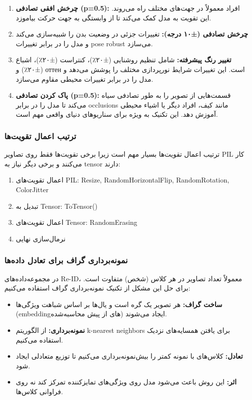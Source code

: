\documentclass[12pt,a4paper]{article}
\theoremstyle{definition}
\begin{document}
\begin{enumerate}
    \item \textbf{چرخش افقی تصادفی (p=0.5):} افراد معمولاً در جهت‌های مختلف راه می‌روند. این تقویت به مدل کمک می‌کند تا از وابستگی به جهت حرکت بیاموزد.

    \item \textbf{چرخش تصادفی (±۱۰ درجه):} تغییرات جزئی در وضعیت بدن را شبیه‌سازی می‌کند و مدل را در برابر تغییرات pose robust می‌سازد.

    \item \textbf{تغییر رنگ پیشرفته:} شامل تنظیم روشنایی (±۲۰٪)، کنتراست (±۲۰٪)، اشباع (±۲۰٪) و оттен است. این تغییرات شرایط نورپردازی مختلف را پوشش می‌دهد و مدل را در برابر تغییرات محیطی مقاوم می‌سازد.

    \item \textbf{پاک کردن تصادفی (p=0.5):} قسمت‌هایی از تصویر را به طور تصادفی سیاه می‌کند تا مدل را در برابر occlusions مانند کیف، افراد دیگر یا اشیاء محیطی آموزش دهد. این تکنیک به ویژه برای سناریوهای دنیای واقعی مهم است.
\end{enumerate}

\subsubsection*{ترتیب اعمال تقویت‌ها}
ترتیب اعمال تقویت‌ها بسیار مهم است زیرا برخی تقویت‌ها فقط روی تصاویر PIL کار می‌کنند و برخی دیگر نیاز به tensor دارند:

\begin{enumerate}
    \item اعمال تقویت‌های PIL: Resize, RandomHorizontalFlip, RandomRotation, ColorJitter
    \item تبدیل به Tensor: ToTensor()
    \item اعمال تقویت‌های Tensor: RandomErasing
    \item نرمال‌سازی نهایی
\end{enumerate}

\subsubsection*{نمونه‌برداری گراف برای تعادل داده‌ها}
در مجموعه‌داده‌های Re-ID، معمولاً تعداد تصاویر در هر کلاس (شخص) متفاوت است. برای حل این مشکل از تکنیک نمونه‌برداری گراف استفاده می‌کنیم:

\begin{itemize}
    \item \textbf{ساخت گراف:} هر تصویر یک گره است و یال‌ها بر اساس شباهت ویژگی‌ها (embeddingهای از پیش محاسبه‌شده) ایجاد می‌شوند.
    \item \textbf{نمونه‌برداری:} از الگوریتم k-nearest neighbors برای یافتن همسایه‌های نزدیک استفاده می‌کنیم.
    \item \textbf{تعادل:} کلاس‌های با نمونه کمتر را بیش‌نمونه‌برداری می‌کنیم تا توزیع متعادلی ایجاد شود.
    \item \textbf{اثر:} این روش باعث می‌شود مدل روی ویژگی‌های تمایزکننده تمرکز کند نه روی فراوانی کلاس‌ها.
\end{itemize}
\end{document}

